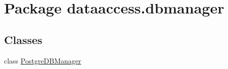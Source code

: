 \hypertarget{namespacedataaccess_1_1dbmanager}{\section{\-Package dataaccess.\-dbmanager}
\label{namespacedataaccess_1_1dbmanager}
}
\subsection*{\-Classes}
\begin{DoxyCompactItemize}
\item 
class \hyperlink{classdataaccess_1_1dbmanager_1_1_postgre_d_b_manager}{\-Postgre\-D\-B\-Manager}
\end{DoxyCompactItemize}
